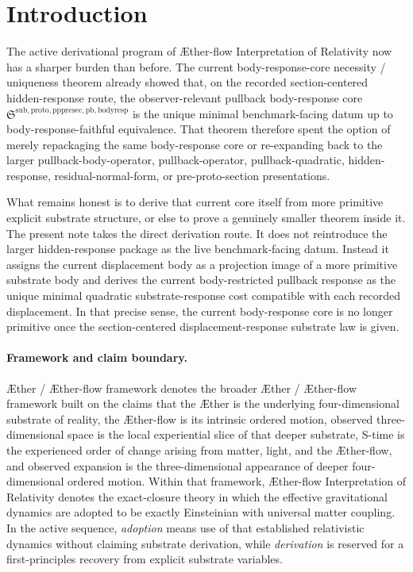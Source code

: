 \documentclass[11pt]{article}
\newcommand{\Aether}{\AE{}ther}
\newcommand{\Aflow}{\AE{}ther-flow}
\newcommand{\TheoryName}{\Aflow{} Interpretation of Relativity}
\newcommand{\TheoryProgram}{\Aether{} / \Aflow{} framework}
\newcommand{\PullbackBodyResponseCore}{\mathfrak S^{\mathrm{sub,proto,pppresec,pb,bodyresp}}}
\begin{document}
\section{Introduction}

The active derivational program of \TheoryName{} now has a sharper burden than before. The current body-response-core necessity / uniqueness theorem already showed that, on the recorded section-centered hidden-response route, the observer-relevant pullback body-response core \(\PullbackBodyResponseCore\) is the unique minimal benchmark-facing datum up to body-response-faithful equivalence. That theorem therefore spent the option of merely repackaging the same body-response core or re-expanding back to the larger pullback-body-operator, pullback-operator, pullback-quadratic, hidden-response, residual-normal-form, or pre-proto-section presentations.

What remains honest is to derive that current core itself from more primitive explicit substrate structure, or else to prove a genuinely smaller theorem inside it. The present note takes the direct derivation route. It does not reintroduce the larger hidden-response package as the live benchmark-facing datum. Instead it assigns the current displacement body as a projection image of a more primitive substrate body and derives the current body-restricted pullback response as the unique minimal quadratic substrate-response cost compatible with each recorded displacement. In that precise sense, the current body-response core is no longer primitive once the section-centered displacement-response substrate law is given.

\paragraph{Framework and claim boundary.}
\TheoryProgram{} denotes the broader \Aether{} / \Aflow{} framework built on the claims that the \Aether{} is the underlying four-dimensional substrate of reality, the \Aflow{} is its intrinsic ordered motion, observed three-dimensional space is the local experiential slice of that deeper substrate, S-time is the experienced order of change arising from matter, light, and the \Aflow{}, and observed expansion is the three-dimensional appearance of deeper four-dimensional ordered motion. Within that framework, \TheoryName{} denotes the exact-closure theory in which the effective gravitational dynamics are adopted to be exactly Einsteinian with universal matter coupling. In the active sequence, \emph{adoption} means use of that established relativistic dynamics without claiming substrate derivation, while \emph{derivation} is reserved for a first-principles recovery from explicit substrate variables.
\end{document}
